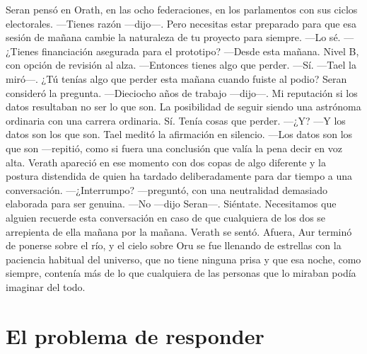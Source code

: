 \documentclass[11pt,a5paper,twoside]{book}
\begin{document}
Seran pensó en Orath, en las ocho federaciones, en los parlamentos con sus ciclos electorales.
—Tienes razón —dijo—. Pero necesitas estar preparado para que esa sesión de mañana cambie la naturaleza de tu proyecto para siempre.
—Lo sé.
—¿Tienes financiación asegurada para el prototipo?
—Desde esta mañana. Nivel B, con opción de revisión al alza.
—Entonces tienes algo que perder.
—Sí. —Tael la miró—. ¿Tú tenías algo que perder esta mañana cuando fuiste al podio?
Seran consideró la pregunta.
—Dieciocho años de trabajo —dijo—. Mi reputación si los datos resultaban no ser lo que son. La posibilidad de seguir siendo una astrónoma ordinaria con una carrera ordinaria. Sí. Tenía cosas que perder.
—¿Y?
—Y los datos son los que son.
Tael meditó la afirmación en silencio.
—Los datos son los que son —repitió, como si fuera una conclusión que valía la pena decir en voz alta.
Verath apareció en ese momento con dos copas de algo diferente y la postura distendida de quien ha tardado deliberadamente para dar tiempo a una conversación.
—¿Interrumpo? —preguntó, con una neutralidad demasiado elaborada para ser genuina.
—No —dijo Seran—. Siéntate. Necesitamos que alguien recuerde esta conversación en caso de que cualquiera de los dos se arrepienta de ella mañana por la mañana.
Verath se sentó.
Afuera, Aur terminó de ponerse sobre el río, y el cielo sobre Oru se fue llenando de estrellas con la paciencia habitual del universo, que no tiene ninguna prisa y que esa noche, como siempre, contenía más de lo que cualquiera de las personas que lo miraban podía imaginar del todo.

\chapter{El problema de responder}
\end{document}
